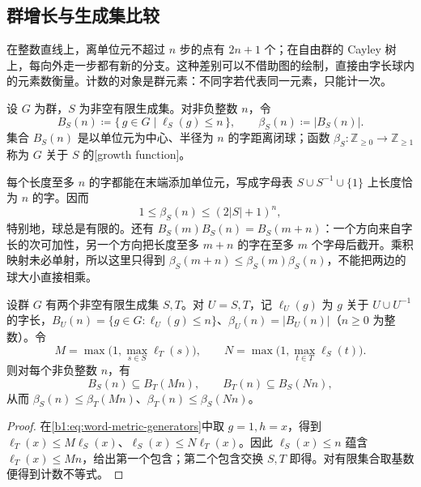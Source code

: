 \subsection{群增长与生成集比较}
\label{b1:subsec:C02:04}

在整数直线上，离单位元不超过 \(n\) 步的点有 \(2n+1\) 个；在自由群的 Cayley 树上，每向外走一步都有新的分支。这种差别可以不借助图的绘制，直接由字长球内的元素数衡量。计数的对象是群元素：不同字若代表同一元素，只能计一次。

\begin{definition}\label{b1:def:group-growth-function}
	设 \(G\) 为群，\(S\) 为非空有限生成集。对非负整数 \(n\)，令
	\[
		B_S(n)\coloneqq\{\,g\in G\mid\ell_S(g)\le n\,\},\qquad
		\beta_S(n)\coloneqq|B_S(n)|.
	\]
	集合 \(B_S(n)\) 是以单位元为中心、半径为 \(n\) 的字距离闭球；函数 \(\beta_S:\mathbb Z_{\ge0}\rightarrow\mathbb Z_{\ge1}\) 称为 \(G\) 关于 \(S\) 的[growth function]。
\end{definition}

每个长度至多 \(n\) 的字都能在末端添加单位元，写成字母表 \(S\cup S^{-1}\cup\{1\}\) 上长度恰为 \(n\) 的字。因而
\[
	1\le\beta_S(n)\le(2|S|+1)^n,
\]
特别地，球总是有限的。还有 \(B_S(m)B_S(n)=B_S(m+n)\)：一个方向来自字长的次可加性，另一个方向把长度至多 \(m+n\) 的字在至多 \(m\) 个字母后截开。乘积映射未必单射，所以这里只得到 \(\beta_S(m+n)\le\beta_S(m)\beta_S(n)\)，不能把两边的球大小直接相乘。

\begin{proposition}\label{b1:prop:growth-generating-set-comparison}
	设群 \(G\) 有两个非空有限生成集 \(S,T\)。对 \(U=S,T\)，记 \(\ell_U(g)\) 为 \(g\) 关于 \(U\cup U^{-1}\) 的字长，\(B_U(n)=\{g\in G:\ell_U(g)\le n\}\)、\(\beta_U(n)=|B_U(n)|\)（\(n\ge0\) 为整数）。令
	\[
		M=\max\bigl(1,\max_{s\in S}\ell_T(s)\bigr),\qquad
		N=\max\bigl(1,\max_{t\in T}\ell_S(t)\bigr).
	\]
	则对每个非负整数 \(n\)，有
	\[
		B_S(n)\subseteq B_T(Mn),\qquad B_T(n)\subseteq B_S(Nn),
	\]
	从而 \(\beta_S(n)\le\beta_T(Mn)\)、\(\beta_T(n)\le\beta_S(Nn)\)。
\end{proposition}
\begin{proof}
	在\eqref{b1:eq:word-metric-generators}中取 \(g=1,h=x\)，得到 \(\ell_T(x)\le M\ell_S(x)\)、\(\ell_S(x)\le N\ell_T(x)\)。因此 \(\ell_S(x)\le n\) 蕴含 \(\ell_T(x)\le Mn\)，给出第一个包含；第二个包含交换 \(S,T\) 即得。对有限集合取基数便得到计数不等式。
\end{proof}

